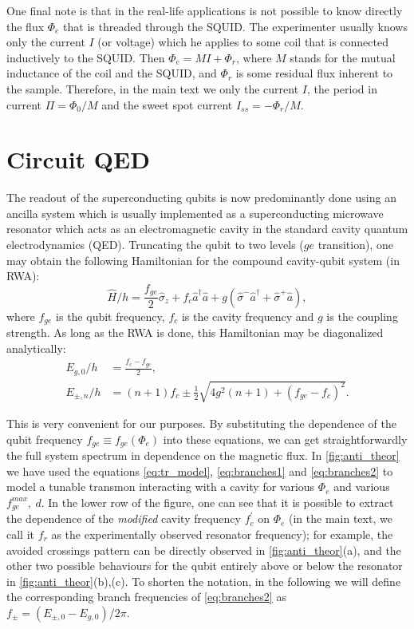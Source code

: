 \documentclass[%
 aip,
 draft,
 amsmath,amssymb,
 reprint,%
]{revtex4-1}
\begin{document}
One final note is that in the real-life applications is not possible to know directly the flux $\Phi_e$ that is threaded through the SQUID. The experimenter usually knows only the current $I$ (or voltage) which he applies to some coil that is connected inductively to the SQUID. Then $\Phi_e = M I + \Phi_r$, where $M$ stands for the mutual inductance of the coil and the SQUID, and $\Phi_r$ is some residual flux inherent to the sample. Therefore, in the main text we only the current $I$, the period in current $\Pi = \Phi_0/M$ and the sweet spot current $I_{ss} = -\Phi_r/M$.

\section{Circuit QED}\label{sec:cqed}

The readout of the superconducting qubits is now predominantly done using an ancilla system which is usually implemented as a superconducting microwave resonator which acts as an electromagnetic cavity in the standard cavity quantum electrodynamics (QED). Truncating the qubit to two levels ($ge$ transition), one may obtain the following Hamiltonian for the compound cavity-qubit system (in RWA):
\begin{equation}
\hat H/h = \frac{f_{ge}}{2} \hat \sigma_z + f_c \hat a^\dagger \hat a + g(\hat \sigma^- \hat a^\dagger + \hat \sigma^+ \hat a),
\end{equation}
where $f_{ge}$ is the qubit frequency, $f_c$ is the cavity frequency and $g$ is the coupling strength. As long as the RWA is done, this Hamiltonian may be diagonalized analytically\cite{blais2004}:
\begin{align}
E_{g, 0}/h &= \frac{f_c - f_{ge}}{2},\label{eq:branches1}
\\
E_{\pm, n}/h &= (n+1)f_c \pm \frac{1}{2}\sqrt{4g^2(n+1)+(f_{ge}-f_c)^2}.
\label{eq:branches2}
\end{align}

This is very convenient for our purposes. By substituting the dependence of the qubit frequency $f_{ge} \equiv f_{ge}(\Phi_e)$ into these equations, we can get straightforwardly the full system spectrum in dependence on the magnetic flux. In \autoref{fig:anti_theor} we have used the equations \eqref{eq:tr_model}, \eqref{eq:branches1} and \eqref{eq:branches2} to model a tunable transmon interacting with a cavity for various $\Phi_e$ and various $f_{ge}^{max},\ d$. In the lower row of the figure, one can see that it is possible to extract the dependence of the \textit{modified} cavity frequency $f_c^\prime$ on $\Phi_e$ (in the main text, we call it $f_r$ as the experimentally observed resonator frequency); for example, the avoided crossings pattern can be directly observed in \autoref{fig:anti_theor}(a), and the other two possible behaviours for the qubit entirely above or below the resonator in \autoref{fig:anti_theor}(b),(c). To shorten the notation, in the following we will define the corresponding branch frequencies of \eqref{eq:branches2} as $f_{\pm} = ( E_{\pm,0}-E_{g,0})/2\pi$.
\end{document}

